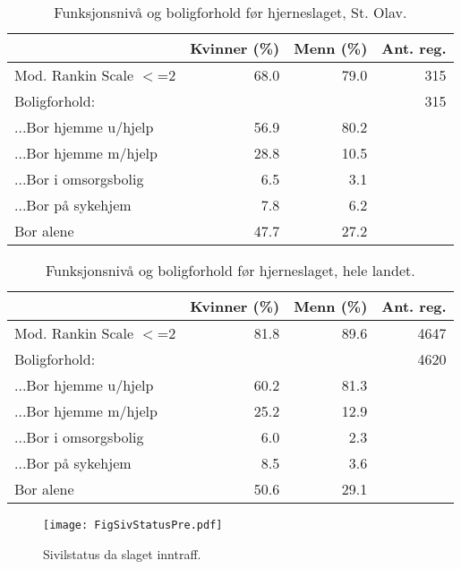 \documentclass [norsk,a4paper,twoside]{article}\usepackage[]{graphicx}\usepackage[]{color}
\begin{document}
\begin{table}[ht]
\centering
\begin{tabular}{lrrr}
  \hline
 & Kvinner (\%) & Menn (\%) & Ant. reg. \\ 
  \hline
Mod. Rankin Scale $<$=2 & 68.0 & 79.0 & 315 \\ 
  Boligforhold: &  &  & 315 \\ 
  ...Bor hjemme u/hjelp & 56.9 & 80.2 &  \\ 
  ...Bor hjemme m/hjelp & 28.8 & 10.5 &  \\ 
  ...Bor i omsorgsbolig & 6.5 & 3.1 &  \\ 
  ...Bor på sykehjem & 7.8 & 6.2 &  \\ 
  Bor alene & 47.7 & 27.2 &  \\ 
   \hline
\end{tabular}
\caption{Funksjonsnivå og boligforhold før hjerneslaget, St. Olav.} 
\label{tab:Boligforh1}
\end{table}
\begin{table}[ht]
\centering
\begin{tabular}{lrrr}
  \hline
 & Kvinner (\%) & Menn (\%) & Ant. reg. \\ 
  \hline
Mod. Rankin Scale $<$=2 & 81.8 & 89.6 & 4647 \\ 
  Boligforhold: &  &  & 4620 \\ 
  ...Bor hjemme u/hjelp & 60.2 & 81.3 &  \\ 
  ...Bor hjemme m/hjelp & 25.2 & 12.9 &  \\ 
  ...Bor i omsorgsbolig & 6.0 & 2.3 &  \\ 
  ...Bor på sykehjem & 8.5 & 3.6 &  \\ 
  Bor alene & 50.6 & 29.1 &  \\ 
   \hline
\end{tabular}
\caption{Funksjonsnivå og boligforhold før hjerneslaget, hele landet.} 
\label{tab:Boligforh2}
\end{table}



\begin{figure}[ht]
{\centering \texttt{[image: FigSivStatusPre.pdf]} }
\caption{\label{fig:SivilstatusPre} Sivilstatus da slaget inntraff.}
\end{figure}
\end{document}
